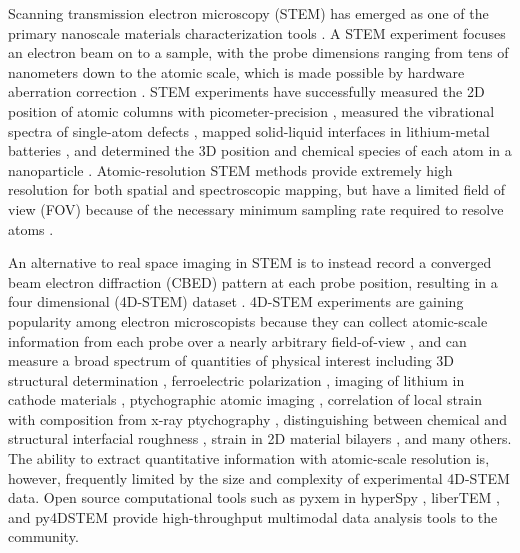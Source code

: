\documentclass[%
 reprint,
superscriptaddress,
 amsmath,
 amssymb,
 prl,
]{revtex4-2}
\begin{document}
Scanning transmission electron microscopy (STEM) has emerged as one of the primary nanoscale materials characterization tools \citep{liu2021advances}. A STEM experiment focuses an electron beam on to a sample, with the probe dimensions ranging from tens of nanometers down to the atomic scale, which is made possible by hardware aberration correction \citep{haider1998electron, krivanek2003towards}. STEM experiments have successfully measured the 2D position of atomic columns with picometer-precision \citep{yankovich2014picometre}, measured the vibrational spectra of single-atom defects \citep{hage2020single}, mapped solid-liquid interfaces in lithium-metal batteries \cite{zachman2018cryo}, and determined the 3D position and chemical species of each atom in a nanoparticle \cite{yang2017deciphering}. Atomic-resolution STEM methods provide extremely high resolution for both spatial and spectroscopic mapping, but have a limited field of view (FOV) because of the necessary minimum sampling rate required to resolve atoms \cite{yankovich2015high}. 

An alternative to real space imaging in STEM is to instead record a converged beam electron diffraction (CBED) pattern at each probe position, resulting in a four dimensional (4D-STEM) dataset \citep{ophus2019four}. 4D-STEM experiments are gaining popularity among electron microscopists because they can collect atomic-scale information from each probe over a nearly arbitrary field-of-view \cite{ozdol2015strain}, and can measure a broad spectrum of quantities of physical interest including 3D structural determination \citep{nord2019three}, ferroelectric polarization \cite{das2019observation}, imaging of lithium in cathode materials \citep{ahmed2020visualization}, ptychographic atomic imaging \citep{chen2021electron}, correlation of local strain with composition from x-ray ptychography \citep{hughes2021correlative}, distinguishing between chemical and structural interfacial roughness \citep{oxley2020deep}, strain in 2D material bilayers \citep{kazmierczak2021strain, zachman2021interferometric}, and many others.  The ability to extract quantitative information with atomic-scale resolution is, however, frequently limited by the size and complexity of experimental 4D-STEM data.  Open source computational tools such as pyxem in hyperSpy \citep{duncan_n_johnstone_2021_4436723}, liberTEM \citep{clausen2020libertem}, and py4DSTEM \cite{savitzky2021py4dstem} provide high-throughput multimodal data analysis tools to the community.


\end{document}
